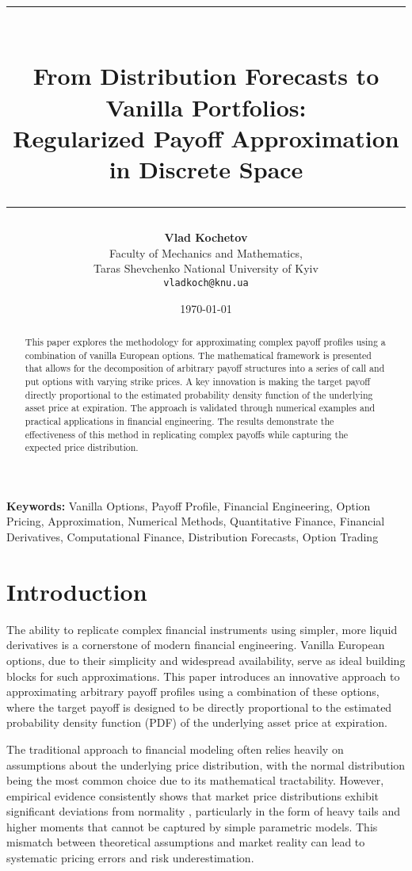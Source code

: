 \documentclass[12pt]{article}
\title{\rule{\textwidth}{4pt}\\[1em]
\textbf{From Distribution Forecasts to Vanilla Portfolios: \\[0.2cm]
Regularized Payoff Approximation in Discrete Space}\\[1em]
\rule{\textwidth}{2pt}}
\author{\small \textbf{Vlad Kochetov} \\
    \small Faculty of Mechanics and Mathematics, \\
    \small Taras Shevchenko National University of Kyiv \\
    \small \texttt{vladkoch@knu.ua}
}
\date{\today}
\providecommand{\keywords}[1]{\textbf{Keywords:} #1}
\begin{document}
\thispagestyle{empty}

\maketitle

\begin{abstract}
This paper explores the methodology for approximating complex payoff profiles using a
combination of vanilla European options. The mathematical framework is presented that
allows for the decomposition of arbitrary payoff structures into a series of call and
put options with varying strike prices. A key innovation is making the target payoff
directly proportional to the estimated probability density function of the underlying
asset price at expiration. The approach is validated through numerical examples and
practical applications in financial engineering. The results demonstrate the effectiveness
of this method in replicating complex payoffs while capturing the expected price
distribution.
\end{abstract}

\newpage

\keywords{
    \small{
        Vanilla Options, 
        Payoff Profile, 
        Financial Engineering, 
        Option Pricing, 
        Approximation, 
        Numerical Methods,
        Quantitative Finance,
        Financial Derivatives,
        Computational Finance,
        Distribution Forecasts,
        Option Trading
    }
}

\section{Introduction}
The ability to replicate complex financial instruments using simpler, more liquid
derivatives is a cornerstone of modern financial engineering. Vanilla European 
options, due to their simplicity and widespread availability, serve as ideal 
building blocks for such approximations. This paper introduces an innovative approach 
to approximating arbitrary payoff profiles using a combination of these options, where 
the target payoff is designed to be directly proportional to the estimated probability 
density function (PDF) of the underlying asset price at expiration.

The traditional approach to financial modeling often relies heavily on assumptions about
the underlying price distribution, with the normal distribution being the most common choice
due to its mathematical tractability. However, empirical evidence consistently shows that
market price distributions exhibit significant deviations from normality \citep{Pokharel2024},
particularly in the form of heavy tails and higher moments that cannot be captured by simple
parametric models. This mismatch between theoretical assumptions and market reality can lead to
systematic pricing errors and risk underestimation.
\end{document}

